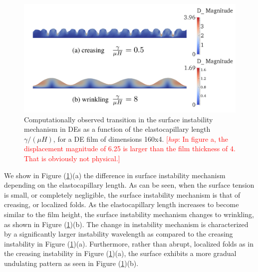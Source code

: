 \documentclass[final,authoryear,3p,times,twocolumn]{elsarticle}
\newcommand{\hsp}[1]{\textcolor{red}{[\textit{hsp}: #1]}}
\begin{document}
\begin{figure} \begin{center} 
\includegraphics[scale=0.4]{pics/wrinkcreas.pdf}
\caption{Computationally observed transition in the surface instability mechanism in DEs as a function of the elastocapillary length $\gamma/(\mu H)$, for a DE film of dimensions 160x4.  \hsp{In figure a, the displacement magnitude of 6.25 is larger than the film thickness of 4.  That is obviously not physical.}}
\label{wrinkcreas} \end{center} \end{figure}

We show in Figure (\ref{wrinkcreas})(a) the difference in surface instability mechanism depending on the elastocapillary length.  As can be seen, when the surface tension is small, or completely negligible, the surface instability mechanism is that of creasing, or localized folds.  As the elastocapillary length increases to become similar to the film height, the surface instability mechanism changes to wrinkling, as shown in Figure (\ref{wrinkcreas})(b).  The change in instability mechanism is characterized by a significantly larger instability wavelength as compared to the creasing instability in Figure (\ref{wrinkcreas})(a).  Furthermore, rather than abrupt, localized folds as in the creasing instability in Figure (\ref{wrinkcreas})(a), the surface exhibits a more gradual undulating pattern as seen in Figure (\ref{wrinkcreas})(b).  
\end{document}

